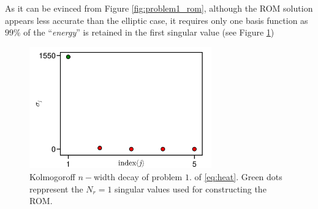 \documentclass[../main.tex]{subfiles}
\begin{document}
As it can be evinced from Figure \ref{fig:problem1_rom}, although the ROM solution appears less accurate than the elliptic case, it requires only one basis function as $99\%$ of the ``\textit{energy}'' is retained in the first singular value (see Figure \ref{fig:problem1_decay})

\begin{figure}[H]
    \centering 
    \includegraphics[keepaspectratio, width=0.7\textwidth]{../figures/fig:problem1_decay.png}
    \caption{Kolmogoroff $n-$width decay of problem $1.$ of \eqref{eq:heat}. Green dots reppresent the $N_{r}=1$ singular values used for constructing the ROM.}
    \label{fig:problem1_decay}
\end{figure}
\end{document}
